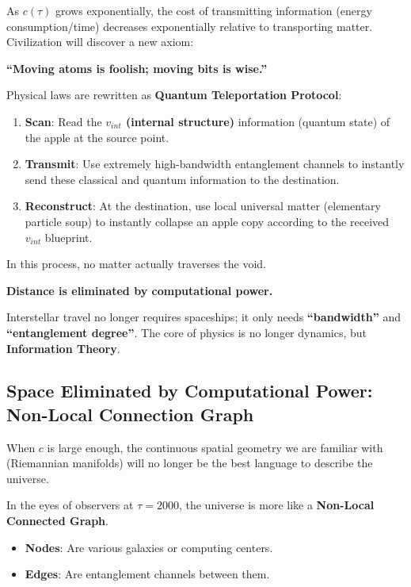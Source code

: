 As $c(\tau)$ grows exponentially, the cost of transmitting information (energy consumption/time) decreases exponentially relative to transporting matter. Civilization will discover a new axiom:

\textbf{``Moving atoms is foolish; moving bits is wise.''}

Physical laws are rewritten as \textbf{Quantum Teleportation Protocol}:

\begin{enumerate}
\item \textbf{Scan}: Read the \textbf{$v_{int}$ (internal structure)} information (quantum state) of the apple at the source point.

\item \textbf{Transmit}: Use extremely high-bandwidth entanglement channels to instantly send these classical and quantum information to the destination.

\item \textbf{Reconstruct}: At the destination, use local universal matter (elementary particle soup) to instantly collapse an apple copy according to the received $v_{int}$ blueprint.
\end{enumerate}

In this process, no matter actually traverses the void.

\textbf{Distance is eliminated by computational power.}

Interstellar travel no longer requires spaceships; it only needs \textbf{``bandwidth''} and \textbf{``entanglement degree''}. The core of physics is no longer dynamics, but \textbf{Information Theory}.

\subsection{Space Eliminated by Computational Power: Non-Local Connection Graph}

When $c$ is large enough, the continuous spatial geometry we are familiar with (Riemannian manifolds) will no longer be the best language to describe the universe.

In the eyes of observers at $\tau = 2000$, the universe is more like a \textbf{Non-Local Connected Graph}.

\begin{itemize}
\item \textbf{Nodes}: Are various galaxies or computing centers.

\item \textbf{Edges}: Are entanglement channels between them.
\end{itemize}

